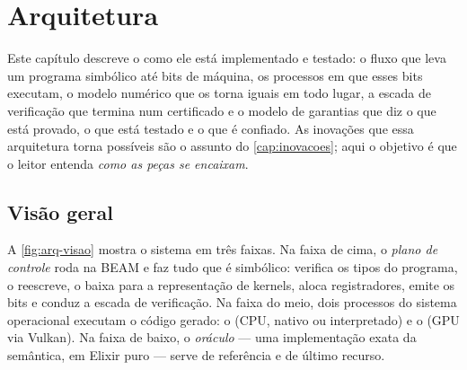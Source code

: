 \chapter{Arquitetura}\label{cap:arquitetura}

Este capítulo descreve o \vapor{} como ele está implementado e testado: o fluxo que leva um programa simbólico até bits de máquina, os processos em que esses bits executam, o modelo numérico que os torna iguais em todo lugar, a escada de verificação que termina num certificado e o modelo de garantias que diz o que está provado, o que está testado e o que é confiado. As inovações que essa arquitetura torna possíveis são o assunto do \autoref{cap:inovacoes}; aqui o objetivo é que o leitor entenda \emph{como as peças se encaixam}.

\section{Visão geral}\label{sec:arq-visao}

A \autoref{fig:arq-visao} mostra o sistema em três faixas. Na faixa de cima, o \emph{plano de controle} roda na BEAM e faz tudo que é simbólico: verifica os tipos do programa, o reescreve, o baixa para a representação de kernels, aloca registradores, emite os bits e conduz a escada de verificação. Na faixa do meio, dois processos do sistema operacional executam o código gerado: o  (CPU, nativo ou interpretado) e o  (GPU via Vulkan). Na faixa de baixo, o \emph{oráculo} --- uma implementação exata da semântica, em Elixir puro --- serve de referência e de último recurso.

